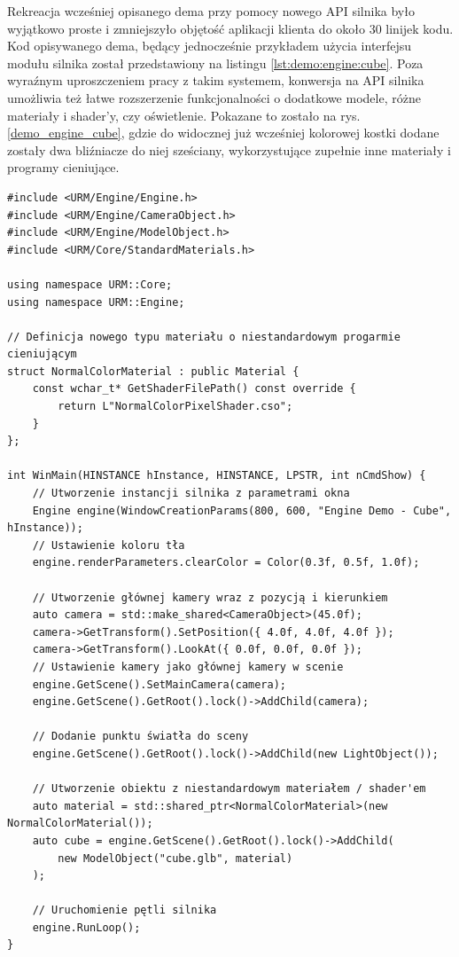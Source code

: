 Rekreacja wcześniej opisanego dema przy pomocy nowego API silnika było wyjątkowo proste i zmniejszyło objętość aplikacji klienta do około 30 linijek kodu. Kod opisywanego dema, będący jednocześnie przykładem użycia interfejsu modułu silnika został przedstawiony na listingu \ref{lst:demo:engine:cube}. Poza wyraźnym uproszczeniem pracy z takim systemem, konwersja na API silnika umożliwia też łatwe rozszerzenie funkcjonalności o dodatkowe modele, różne materiały i shader'y, czy oświetlenie. Pokazane to zostało na rys. \ref{demo_engine_cube}, gdzie do widocznej już wcześniej kolorowej kostki dodane zostały dwa bliźniacze do niej sześciany, wykorzystujące zupełnie inne materiały i programy cieniujące.

\begin{lstlisting}[caption={Pełny kod programu wykorzystującego API silnika do wyświetlenia trzech sześcianów o różnych materiałach.}, label={lst:demo:engine:cube}]
#include <URM/Engine/Engine.h>
#include <URM/Engine/CameraObject.h>
#include <URM/Engine/ModelObject.h>
#include <URM/Core/StandardMaterials.h>

using namespace URM::Core;
using namespace URM::Engine;

// Definicja nowego typu materiału o niestandardowym progarmie cieniującym
struct NormalColorMaterial : public Material {
	const wchar_t* GetShaderFilePath() const override { 
		return L"NormalColorPixelShader.cso";
	}
};
	
int WinMain(HINSTANCE hInstance, HINSTANCE, LPSTR, int nCmdShow) {
	// Utworzenie instancji silnika z parametrami okna
	Engine engine(WindowCreationParams(800, 600, "Engine Demo - Cube", hInstance));
	// Ustawienie koloru tła
	engine.renderParameters.clearColor = Color(0.3f, 0.5f, 1.0f);
	
	// Utworzenie głównej kamery wraz z pozycją i kierunkiem
	auto camera = std::make_shared<CameraObject>(45.0f);
	camera->GetTransform().SetPosition({ 4.0f, 4.0f, 4.0f });
	camera->GetTransform().LookAt({ 0.0f, 0.0f, 0.0f });
	// Ustawienie kamery jako głównej kamery w scenie
	engine.GetScene().SetMainCamera(camera);
	engine.GetScene().GetRoot().lock()->AddChild(camera);
	
	// Dodanie punktu światła do sceny
	engine.GetScene().GetRoot().lock()->AddChild(new LightObject());
	
	// Utworzenie obiektu z niestandardowym materiałem / shader'em
	auto material = std::shared_ptr<NormalColorMaterial>(new NormalColorMaterial());
	auto cube = engine.GetScene().GetRoot().lock()->AddChild(
		new ModelObject("cube.glb", material)
	);
	
	// Uruchomienie pętli silnika
	engine.RunLoop();
}
\end{lstlisting}


